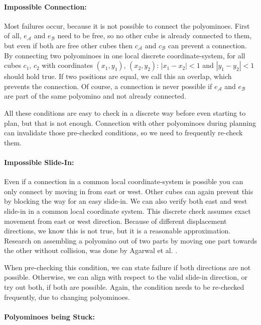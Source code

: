 \paragraph{Impossible Connection:}

Most failures occur, because it is not possible to connect the polyominoes.
First of all, $e_\mathcal{A}$ and $e_\mathcal{B}$ need to be free, so no other cube is already connected to them, but even if both are free other cubes then $c_\mathcal{A}$ and $c_\mathcal{B}$ can prevent a connection.
By connecting two polyominoes in one local discrete coordinate-system, for all cubes $c_1$, $c_2$ with coordinates $(x_1, y_1)$, $(x_2, y_2)$: $\left|x_1 - x_2\right| < 1$ and $\left|y_1 - y_2\right| < 1$ should hold true.
If two positions are equal, we call this an overlap, which prevents the connection.
Of course, a connection is never possible if $e_\mathcal{A}$ and $e_\mathcal{B}$ are part of the same polyomino and not already connected.

All these conditions are easy to check in a discrete way before even starting to plan, but that is not enough.
Connection with other polyominoes during planning can invalidate those pre-checked conditions, so we need to frequently re-check them.

\paragraph{Impossible Slide-In:}

Even if a connection in a common local coordinate-system is possible you can only connect by moving in from east or west.
Other cubes can again prevent this by blocking the way for an easy slide-in.
We can also verify both east and west slide-in in a common local coordinate system.
This discrete check assumes exact movement from east or west direction.
Because of different displacement directions, we know this is not true, but it is a reasonable approximation.
Research on assembling a polyomino out of two parts by moving one part towards the other without collision, was done by Agarwal et al. \cite{agarwal2021}. 

When pre-checking this condition, we can state failure if both directions are not possible.
Otherwise, we can align with respect to the valid slide-in direction, or try out both, if both are possible.
Again, the condition needs to be re-checked frequently, due to changing polyominoes.

\paragraph{Polyominoes being Stuck:}

